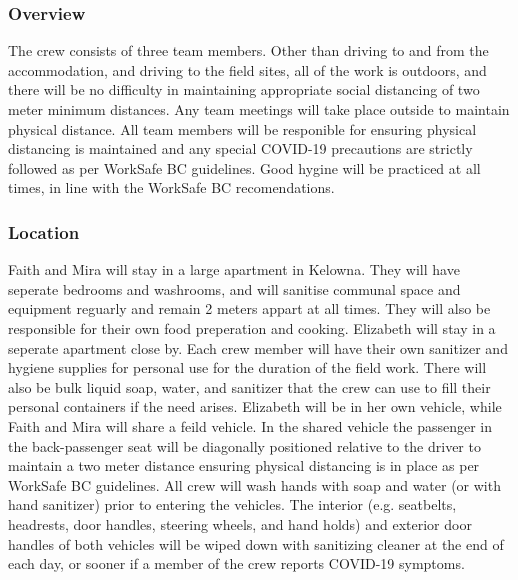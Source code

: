 \documentclass[11pt,letter]{article}
\begin{document}
\subsubsection{Overview}
The crew consists of three team members. Other than driving to and from the accommodation, and driving to the field sites, all of the work is outdoors, and there will be no difficulty in maintaining appropriate social distancing of two meter minimum distances. Any team meetings will take place outside to maintain physical distance. All team members will be responible for ensuring physical distancing is maintained and any special COVID-19 precautions are strictly followed as per WorkSafe BC guidelines. Good hygine will be practiced at all times, in line with the  WorkSafe BC recomendations.    

\subsubsection{Location}
Faith and Mira will stay in a large apartment in Kelowna. They will have seperate bedrooms and washrooms, and will sanitise communal space and equipment reguarly and remain 2 meters appart at all times. They will also be responsible for their own food preperation and cooking. Elizabeth will stay in a seperate apartment close by. Each crew member will have their own sanitizer and hygiene supplies for personal use for the duration of the field work. There will also be bulk liquid soap, water, and sanitizer that the crew can use to fill their personal containers if the need arises. Elizabeth will be in her own vehicle, while Faith and Mira will share a feild vehicle. In the shared vehicle the passenger in the back-passenger seat will be diagonally positioned relative to the driver to maintain a two meter distance ensuring physical distancing is in place as per WorkSafe BC guidelines. All crew will wash hands with soap and water (or with hand sanitizer) prior to entering the vehicles. The interior (e.g. seatbelts, headrests, door handles, steering wheels, and hand holds) and exterior door handles of both vehicles will be wiped down with sanitizing cleaner at the end of each day, or sooner if a member of the crew reports COVID-19 symptoms.  
\end{document}
